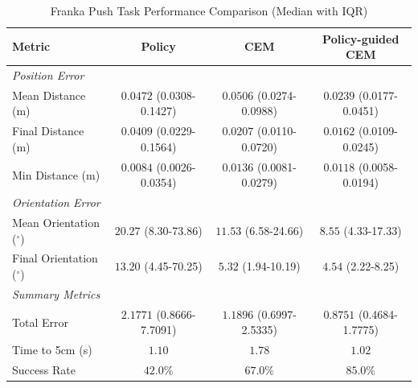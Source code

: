 \begin{table}[htbp]
\centering
\caption{Franka Push Task Performance Comparison (Median with IQR)}
\label{tab:franka_push_results}
\begin{tabular}{lccc}
\toprule
Metric & Policy & CEM & Policy-guided CEM \\
\midrule
\multicolumn{4}{l}{\textit{Position Error}} \\
Mean Distance (m) & $0.0472$ (0.0308-0.1427) & $0.0506$ (0.0274-0.0988) & $0.0239$ (0.0177-0.0451) \\
Final Distance (m) & $0.0409$ (0.0229-0.1564) & $0.0207$ (0.0110-0.0720) & $0.0162$ (0.0109-0.0245) \\
Min Distance (m) & $0.0084$ (0.0026-0.0354) & $0.0136$ (0.0081-0.0279) & $0.0118$ (0.0058-0.0194) \\
\midrule
\multicolumn{4}{l}{\textit{Orientation Error}} \\
Mean Orientation ($^\circ$) & $20.27$ (8.30-73.86) & $11.53$ (6.58-24.66) & $8.55$ (4.33-17.33) \\
Final Orientation ($^\circ$) & $13.20$ (4.45-70.25) & $5.32$ (1.94-10.19) & $4.54$ (2.22-8.25) \\
\midrule
\multicolumn{4}{l}{\textit{Summary Metrics}} \\
Total Error & $2.1771$ (0.8666-7.7091) & $1.1896$ (0.6997-2.5335) & $0.8751$ (0.4684-1.7775) \\
Time to 5cm (s) & $1.10$ & $1.78$ & $1.02$ \\
Success Rate & $42.0\%$ & $67.0\%$ & $85.0\%$ \\
\bottomrule
\end{tabular}
\end{table}